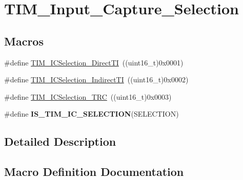 \hypertarget{group___t_i_m___input___capture___selection}{}\section{T\+I\+M\+\_\+\+Input\+\_\+\+Capture\+\_\+\+Selection}
\label{group___t_i_m___input___capture___selection}
\subsection*{Macros}
\begin{DoxyCompactItemize}
\item 
\#define \hyperlink{group___t_i_m___input___capture___selection_ga3d38876044457b7faefe951d367ac8c3}{T\+I\+M\+\_\+\+I\+C\+Selection\+\_\+\+Direct\+T\+I}~((uint16\+\_\+t)0x0001)
\item 
\#define \hyperlink{group___t_i_m___input___capture___selection_ga2289b684133ac0b81ddfcd860d01b144}{T\+I\+M\+\_\+\+I\+C\+Selection\+\_\+\+Indirect\+T\+I}~((uint16\+\_\+t)0x0002)
\item 
\#define \hyperlink{group___t_i_m___input___capture___selection_ga2cd464e97ffd6ea3208ec65672f9a373}{T\+I\+M\+\_\+\+I\+C\+Selection\+\_\+\+T\+R\+C}~((uint16\+\_\+t)0x0003)
\item 
\#define {\bfseries I\+S\+\_\+\+T\+I\+M\+\_\+\+I\+C\+\_\+\+S\+E\+L\+E\+C\+T\+I\+O\+N}(S\+E\+L\+E\+C\+T\+I\+O\+N)
\end{DoxyCompactItemize}


\subsection{Detailed Description}


\subsection{Macro Definition Documentation}
\hypertarget{group___t_i_m___input___capture___selection_ga623d8592109f4702829ae7fc3806bcb8}{}
